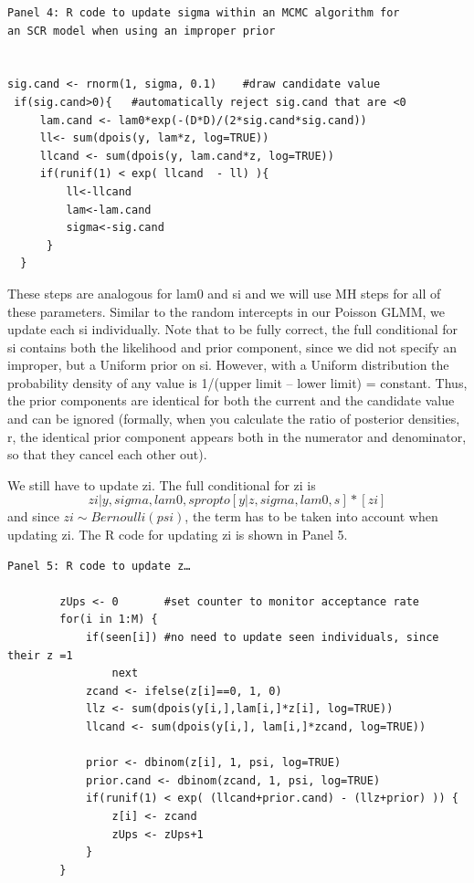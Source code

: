 {\small
\begin{verbatim}
Panel 4: R code to update sigma within an MCMC algorithm for
an SCR model when using an improper prior


sig.cand <- rnorm(1, sigma, 0.1)	#draw candidate value
 if(sig.cand>0){   #automatically reject sig.cand that are <0
     lam.cand <- lam0*exp(-(D*D)/(2*sig.cand*sig.cand))
     ll<- sum(dpois(y, lam*z, log=TRUE))
     llcand <- sum(dpois(y, lam.cand*z, log=TRUE))
     if(runif(1) < exp( llcand  - ll) ){
         ll<-llcand
         lam<-lam.cand
         sigma<-sig.cand
      }
  }

\end{verbatim}
}
These steps are analogous for lam0 and si and we will use MH steps for
all of these parameters. Similar to the random intercepts in our
Poisson GLMM, we update each si individually. Note that to be fully
correct, the full conditional for si contains both the likelihood and
prior component, since we did not specify an improper, but a Uniform
prior on si. However, with a Uniform distribution the probability
density of any value is 1/(upper limit – lower limit) =
constant. Thus, the prior components are identical for both the
current and the candidate value and can be ignored (formally, when you
calculate the ratio of posterior densities, r, the identical prior
component appears both in the numerator and denominator, so that they
cancel each other out).

We still have to update zi. The full conditional for zi is
\[
zi|y, sigma, lam0, s propto [y|z,sigma, lam0, s] * [zi]
\]
and since $zi \sim Bernoulli(psi)$,
the term has to be taken into account when updating zi. The R code for updating zi is shown in Panel 5.

{\small
\begin{verbatim}
Panel 5: R code to update z…

        zUps <- 0		#set counter to monitor acceptance rate
        for(i in 1:M) {
            if(seen[i])	#no need to update seen individuals, since their z =1
                next
            zcand <- ifelse(z[i]==0, 1, 0)
            llz <- sum(dpois(y[i,],lam[i,]*z[i], log=TRUE))
            llcand <- sum(dpois(y[i,], lam[i,]*zcand, log=TRUE))

            prior <- dbinom(z[i], 1, psi, log=TRUE)
            prior.cand <- dbinom(zcand, 1, psi, log=TRUE)
            if(runif(1) < exp( (llcand+prior.cand) - (llz+prior) )) {
                z[i] <- zcand
                zUps <- zUps+1
            }
        }
\end{verbatim}
}

